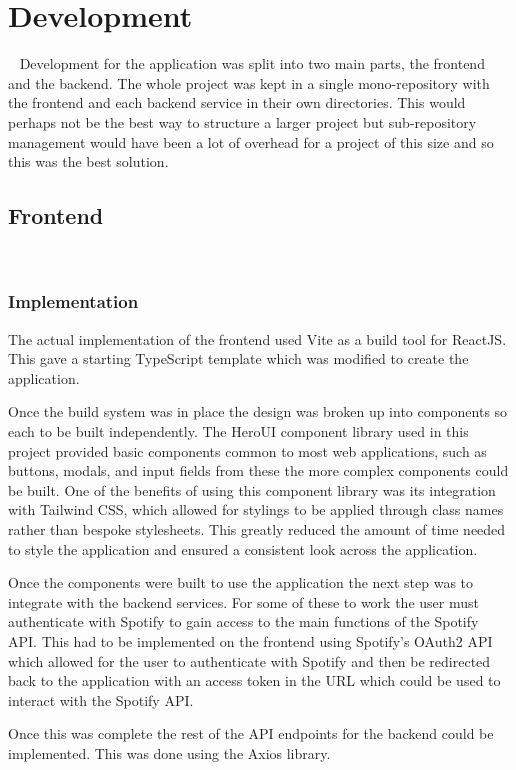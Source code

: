 \chapter{Development}~\label{cha:development}
Development for the application was split into two main parts, the frontend and the backend. The whole project was kept in a single mono-repository with the frontend and each backend service in their own directories. This would perhaps not be the best way to structure a larger project but sub-repository management would have been a lot of overhead for a project of this size and so this was the best solution.

\section{Frontend}~\label{sec:frontend-development}
\subsection{Implementation}
The actual implementation of the frontend used Vite as a build tool for ReactJS. This gave a starting TypeScript template which was modified to create the application.

Once the build system was in place the design was broken up into components so each to be built independently. The HeroUI component library used in this project provided basic components common to most web applications, such as buttons, modals, and input fields from these the more complex components could be built. One of the benefits of using this component library was its integration with Tailwind CSS, which allowed for stylings to be applied through class names rather than bespoke stylesheets. This greatly reduced the amount of time needed to style the application and ensured a consistent look across the application.

Once the components were built to use the application the next step was to integrate with the backend services. For some of these to work the user must authenticate with Spotify to gain access to the main functions of the Spotify API. This had to be implemented on the frontend using Spotify's OAuth2 API which allowed for the user to authenticate with Spotify and then be redirected back to the application with an access token in the URL which could be used to interact with the Spotify API.

Once this was complete the rest of the API endpoints for the backend could be implemented. This was done using the Axios library.

